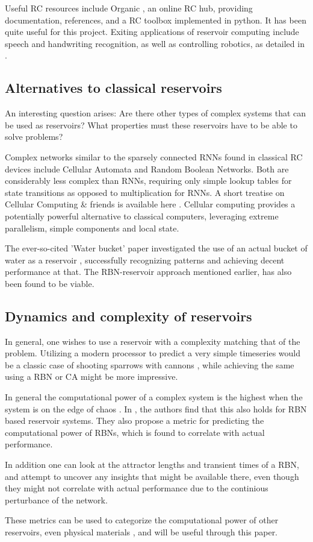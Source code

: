 Useful RC resources include Organic \cite{organic}, an online RC hub,
providing documentation, references, and a RC toolbox implemented in python.
It has been quite useful for this project.
Exiting applications of reservoir computing include speech and handwriting recognition,
as well as controlling robotics, as detailed in \cite{lukovsevivcius2012reservoir}.

\subsection{Alternatives to classical reservoirs}

An interesting question arises:
Are there other types of complex systems that can be used as reservoirs?
What properties must these reservoirs have to be able to solve problems?

Complex networks similar to the sparsely connected RNNs found in classical RC devices include Cellular Automata and Random Boolean Networks.
Both are considerably less complex than RNNs, requiring only simple lookup tables for state transitions as opposed to multiplication for RNNs.
A short treatise on Cellular Computing \& friends is available here \cite{sipper1999emergence}.
Cellular computing provides a potentially powerful alternative to classical computers,
leveraging extreme parallelism, simple components and local state.

The ever-so-cited 'Water bucket' paper investigated the use of an actual bucket of water as a reservoir \cite{fernando2003pattern},
successfully recognizing patterns and achieving decent performance at that.
The RBN-reservoir \cite{rbn-reservoir} approach mentioned earlier, has also been found to be viable.

\subsection{Dynamics and complexity of reservoirs}

In general, one wishes to use a reservoir with a complexity matching that of the problem.
Utilizing a modern processor to predict a very simple timeseries would be a classic case of shooting sparrows with cannons \cite{wiki:sparrow},
while achieving the same using a RBN or CA might be more impressive.

In general the computational power of a complex system is the highest when the system is on the edge of chaos \cite{langton3computation}.
In \cite{rbn-reservoir}, the authors find that this also holds for RBN based reservoir systems.
They also propose a metric for predicting the computational power of RBNs,
which is found to correlate with actual performance.

In addition one can look at the attractor lengths and transient times of a RBN,
and attempt to uncover any insights that might be available there,
even though they might not correlate with actual performance due to the continious perturbance of the network.

These metrics can be used to categorize the computational power of other reservoirs,
even physical materials \cite{miller2002evolution},
and will be useful through this paper.
